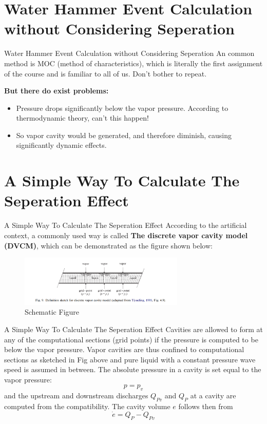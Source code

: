 \documentclass[UTF8]{ctexbeamer}
\begin{document}
\section{Water Hammer Event Calculation without Considering Seperation}
\begin{frame}{Water Hammer Event Calculation without Considering Seperation}
    An common method is MOC (method of characteristics), which is literally the first assignment of the course and is familiar to all of us. Don't bother to repeat.
    
    \textbf{But there do exist problems:}
    \begin{itemize}
        \item Pressure drops significantly below the vapor pressure. According to thermodynamic theory, can't this happen!
        \item So vapor cavity would be generated, and therefore diminish, causing significantly dynamic effects.
    \end{itemize}
\end{frame}

\section{A Simple Way To Calculate The Seperation Effect}
\begin{frame}{A Simple Way To Calculate The Seperation Effect}
    According to the artificial context, a commonly used way is called \textbf{The discrete vapor cavity model (DVCM)}, which can be demonstrated as the figure shown below:
    
    \begin{figure}
        \includegraphics[width=0.7\textwidth]{image.png}
        \caption{Schematic Figure}
    \end{figure}
\end{frame}
    
\begin{frame}{A Simple Way To Calculate The Seperation Effect}
    Cavities are allowed to form at any of the computational sections (grid points) if the pressure is computed to be below the vapor pressure. Vapor cavities are thus confined to computational sections as sketched in Fig above and pure liquid with a constant pressure wave speed is assumed in between. The absolute pressure in a cavity is set equal to the vapor pressure:
    \begin{equation}
        p = p_v
    \end{equation}
    and the upstream and downstream discharges $Q_{Pv}$ and ${Q_P}$ at a cavity are computed from the compatibility. The cavity volume $e$ follows then from
    \begin{equation}
        \dot e = Q_{P} - Q_{Pv}
    \end{equation}
\end{frame}
\end{document}
